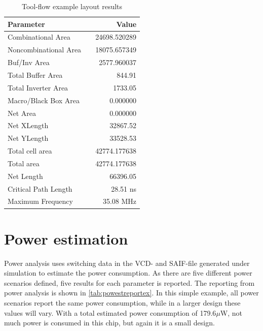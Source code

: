 \begin{table}[hbpt]
    \centering
    \begin{tabular}{lcr}
        \textbf{Parameter} && \textbf{Value} \\
        \toprule
        Combinational Area && 24698.520289 \\
        Noncombinational Area && 18075.657349 \\
        Buf/Inv Area && 2577.960037 \\
        Total Buffer Area && 844.91 \\
        Total Inverter Area && 1733.05 \\
        Macro/Black Box Area && 0.000000 \\
        Net Area && 0.000000 \\
        Net XLength && 32867.52 \\
        Net YLength && 33528.53 \\
        \midrule
        Total cell area && 42774.177638 \\
        Total area && 42774.177638 \\
        Net Length && 66396.05 \\
        \midrule
        Critical Path Length && 28.51 ns \\
        Maximum Frequency && 35.08 MHz\\
        \bottomrule
    \end{tabular}
    \caption{Tool-flow example layout results}
    \label{tab:layoutreportex}
\end{table}

\section{Power estimation}
Power analysis uses switching data in the VCD- and SAIF-file generated under simulation to estimate the power consumption. As there are five different power scenarios defined, five results for each parameter is reported. The reporting from power analysis is shown in \cref{tab:powestreportex}. In this simple example, all power scenarios report the same power consumption, while in a larger design these values will vary. With a total estimated power consumption of 179.6$\mu$W, not much power is consumed in this chip, but again it is a small design.

